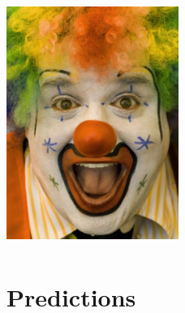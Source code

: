 \documentclass[10pt,serif]{beamer}
\begin{document}
\subsection{}
\begin{frame}
\begin{center}
\includegraphics[width=5.6cm,height=8cm]{clown.jpg}
\end{center}
\end{frame}
\section{Predictions}
\end{document}
